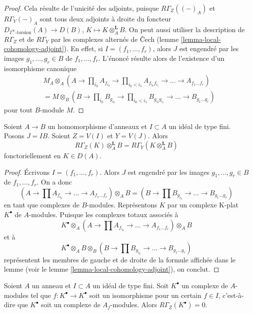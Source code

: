 \begin{proof}
Cela résulte de l'unicité des adjoints, puisque $R\Gamma_Z((-)_A)$ et $R\Gamma_Y(-)_A$
sont tous deux adjoints à droite du foncteur $D_{I^\infty\text{-torsion}}(A) \to D(B)$,
$K \mapsto K \otimes_A^\mathbf{L} B$.
On peut aussi utiliser la description de $R\Gamma_Z$ et de $R\Gamma_Y$
par les complexes alternés de {\v C}ech
(lemme \ref{lemma-local-cohomology-adjoint}).
En effet, si $I = (f_1, \ldots, f_r)$, alors $J$ est engendré par les images
$g_1, \ldots, g_r \in B$ de $f_1, \ldots, f_r$.
L'énoncé résulte alors de l'existence d'un isomorphisme canonique
\begin{align*}
& M_A \otimes_A (A \to \prod\nolimits_{i_0} A_{f_{i_0}} \to
\prod\nolimits_{i_0 < i_1} A_{f_{i_0}f_{i_1}}
\to \ldots \to A_{f_1\ldots f_r}) \\
& = 
M \otimes_B (B \to \prod\nolimits_{i_0} B_{g_{i_0}} \to
\prod\nolimits_{i_0 < i_1} B_{g_{i_0}g_{i_1}}
\to \ldots \to B_{g_1\ldots g_r})
\end{align*}
pour tout $B$-module $M$.
\end{proof}

\begin{lemma}
\label{lemma-torsion-change-rings}
Soient $A \to B$ un homomorphisme d'anneaux et $I \subset A$ un idéal de type fini.
Posons $J = IB$. Soient $Z = V(I)$ et $Y = V(J)$. Alors
$$
R\Gamma_Z(K) \otimes_A^\mathbf{L} B = R\Gamma_Y(K \otimes_A^\mathbf{L} B)
$$
fonctoriellement en $K \in D(A)$.
\end{lemma}

\begin{proof}
Écrivons $I = (f_1, \ldots, f_r)$. Alors $J$ est engendré par les images
$g_1, \ldots, g_r \in B$ de $f_1, \ldots, f_r$. On a donc
$$
(A \to \prod A_{f_{i_0}} \to \ldots \to A_{f_1\ldots f_r}) \otimes_A B =
(B \to \prod B_{g_{i_0}} \to \ldots \to B_{g_1\ldots g_r})
$$
en tant que complexes de $B$-modules. Représentons $K$
par un complexe K-plat $K^\bullet$ de $A$-modules.
Puisque les complexes totaux associés à
$$
K^\bullet \otimes_A
(A \to \prod A_{f_{i_0}} \to \ldots \to A_{f_1\ldots f_r}) \otimes_A B
$$
et à
$$
K^\bullet \otimes_A B \otimes_B
(B \to \prod B_{g_{i_0}} \to \ldots \to B_{g_1\ldots g_r})
$$
représentent les membres de gauche et de droite de la formule
affichée dans le lemme (voir le lemme \ref{lemma-local-cohomology-adjoint}), on conclut.
\end{proof}

\begin{lemma}
\label{lemma-local-cohomology-vanishes}
Soient $A$ un anneau et $I \subset A$ un idéal de type fini.
Soit $K^\bullet$ un complexe de $A$-modules tel que
$f : K^\bullet \to K^\bullet$ soit un isomorphisme pour un certain $f \in I$,
c'est-à-dire que $K^\bullet$ soit un complexe de $A_f$-modules. Alors
$R\Gamma_Z(K^\bullet) = 0$.
\end{lemma}

